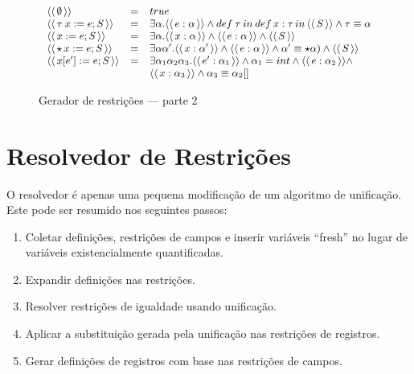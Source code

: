 \documentclass[a4paper,8pt]{article}
\newcommand{\constr}[1]{\ensuremath{\langle\langle\,#1\,\rangle\rangle}}
\begin{document}
     \begin{figure}[h]
       \[
          \small{
           \begin{array}{lcl}
               \constr{\emptyset} & = & true \\
               \constr{\tau\:x := e; S} & = & \exists \alpha. \constr{e : \alpha} \land
                                              def\:\tau\: in\:
                                              def\,x:\tau\,in\,\constr{S}
             \land \tau \equiv \alpha\\
               \constr{x := e ; S} & = & \exists \alpha. \constr{x : \alpha}\land\constr{e : \alpha} \land
                                                      \constr{S}\\ 
               \constr{\star\,x := e ; S} & = & \exists \alpha \alpha'. \constr{x : \alpha'}\land\constr{e : \alpha} \land
                                                      \alpha' \equiv
                                                \star \alpha)\land\constr{S}\\ 
               \constr{x[e'] := e ; S} & = &
                                             \exists\alpha_1\alpha_2\alpha_3.\constr{e'
                                             : \alpha_1}\land \alpha_1
                                             = int \land \constr{e :
                                             \alpha_2} \land \\ 
                       & & \constr{x : \alpha_3} \land
                           \alpha_3 \equiv \alpha_2[] \\
           \end{array}}
       \]
       \caption{Gerador de restrições --- parte 2}
     \end{figure}

     \section{Resolvedor de Restrições}\label{constraintsolver}

     O resolvedor é apenas uma pequena modificação de um algoritmo de
     unificação. Este pode ser resumido nos seguintes passos:
     \begin{enumerate}
          \item Coletar definições, restrições de campos e inserir
            variáveis ``fresh'' no lugar de variáveis existencialmente
            quantificadas.
          \item Expandir definições nas restrições.
          \item Resolver restrições de igualdade usando unificação.
          \item Aplicar a substituição gerada pela unificação nas
            restrições de registros.
          \item Gerar definições de registros com base nas restrições
            de campos.
     \end{enumerate}
\end{document}
